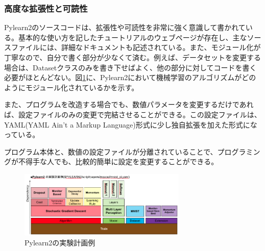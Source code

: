\subsubsection{高度な拡張性と可読性}
Pylearn2のソースコードは、拡張性や可読性を非常に強く意識して書かれている。基本的な使い方を記したチュートリアルのウェブページが存在し、主なソースファイルには、詳細なドキュメントも記述されている。また、モジュール化が丁寧なので、自分で書く部分が少なくて済む。例えば、データセットを変更する場合は、Datasetクラスのみを書き下せばよく、他の部分に対してコードを書く必要がほとんどない。図\ref{c4_Pylearn2_yaml}に、Pylearn2において機械学習のアルゴリズムがどのようにモジュール化されているかを示す。\par
また、プログラムを改造する場合でも、数値パラメータを変更するだけであれば、設定ファイルのみの変更で完結させることができる。この設定ファイルは、YAML(YAML Ain't a Markup Language)形式に少し独自拡張を加えた形式になっている。\par
プログラム本体と、数値の設定ファイルが分離されていることで、プログラミングが不得手な人でも、比較的簡単に設定を変更することができる。\par
\begin{figure}[tbp]
 \begin{center}
  \includegraphics[width=80mm]{img/c4/Pylearn2_yaml}
 \end{center}
 \caption{Pylearn2の実験計画例}
 \label{c4_Pylearn2_yaml}
\end{figure}


